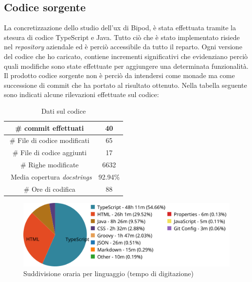 \subsection{Codice sorgente}
La concretizzazione dello studio dell'\acrshort{ux} di Bipod, è stata effettuata tramite la stesura di codice TypeScript e Java. Tutto ciò che è stato implementato risiede nel \textit{repository} aziendale ed è perciò accessibile da tutto il reparto. Ogni versione del codice che ho caricato, contiene incrementi significativi che evidenziano perciò quali modifiche sono state effettuate per aggiungere una determinata funzionalità. Il prodotto codice sorgente non è perciò da intendersi come monade ma come successione di \gls{commit} che ha portato al risultato ottenuto.
Nella tabella seguente sono indicati alcune rilevazioni effettuate sul codice:
\begin{table}[H]
    \centering
    \begin{tabular}{|c|c|}
    \hline
        \# commit effettuati & 40 \\ \hline
        \# File di codice modificati & 65 \\ \hline
        \# File di codice aggiunti & 17 \\ \hline
        \# Righe modificate & 6632 \\ \hline
        \ Media copertura \textit{docstrings} & 92.94\% \\ \hline
        \# Ore di codifica & 88 \\ \hline
    \end{tabular}
    \caption{Dati sul codice}
    \label{tab:codeData}
\end{table}
\begin{figure}[H]
    \centering
    \includegraphics[width=0.9\columnwidth]{immagini/linguaggi.png}
    \caption{Suddivisione oraria per linguaggio (tempo di digitazione)}
    \label{fig:languages}
\end{figure}
